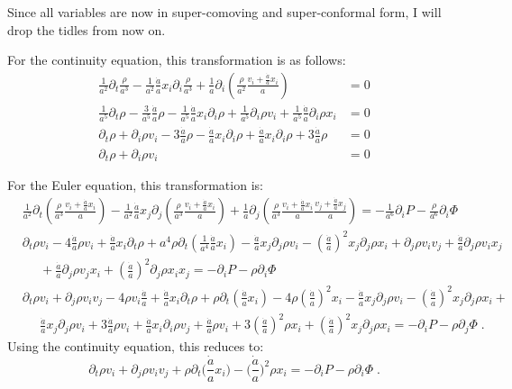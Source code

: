 \documentclass{article}
\begin{document}
Since all variables are now in super-comoving and super-conformal form, I will drop the tidles from now on.

For the continuity equation, this transformation is as follows:
\begin{align*}
\frac{1}{a^2} \partial_t \frac{\rho}{a^3} - \frac{1}{a^2} \frac{\dot{a}}{a} x_i \partial_i \frac{\rho}{a^3} + \frac{1}{a} \partial_i ( \frac{\rho}{a^2} \frac{ v_i + \frac{\dot{a}}{a} x_i}{a} ) &= 0 \\
\frac{1}{a^5} \partial_t \rho - \frac{3}{a^5} \frac{\dot{a}}{a} \rho - \frac{1}{a^5}\frac{\dot{a}}{a} x_i \partial_i \rho + \frac{1}{a^5} \partial_i \rho v_i + \frac{1}{a^5} \frac{\dot{a}}{a} \partial_i \rho x_i &=0 \\
\partial_t \rho + \partial_i \rho v_i - 3 \frac{\dot{a}}{a} \rho - \frac{\dot{a}}{a} x_i \partial_i \rho + \frac{\dot{a}}{a} x_i \partial_i \rho + 3 \frac{\dot{a}}{a} \rho &= 0 \\
\partial_t \rho + \partial_i \rho v_i &= 0
\end{align*}

For the Euler equation, this transformation is:
\begin{align*}
  &\frac{1}{a^2} \partial_t ( \frac{\rho}{a^3} \frac{v_i +\frac{\dot{a}}{a} x_i}{a} ) 
- \frac{1}{a^2} \frac{\dot{a}}{a} x_j \partial_j ( \frac{\rho}{a^3} \frac{ v_i + \frac{\dot{a}}{a} x_i }{a} ) 
+ \frac{1}{a} \partial_j ( \frac{\rho}{a^3} \frac{v_i + \frac{\dot{a}}{a} x_i}{a} \frac{v_j + \frac{\dot{a}}{a} x_j }{a} ) 
= - \frac{1}{a^6} \partial_i P - \frac{\rho}{a^6} \partial_i \Phi \\
&\partial_t \rho v_i 
-4 \frac{\dot{a}}{a} \rho v_i 
+ \frac{\dot{a}}{a} x_i \partial_t \rho 
+ a^4 \rho \partial_t ( \frac{1}{a^4} \frac{\dot{a}}{a} x_i  ) 
- \frac{\dot{a}}{a} x_j  \partial_j \rho v_i 
- (\frac{\dot{a}}{a})^2 x_j \partial_j \rho x_i 
+ \partial_j \rho v_i v_j 
+ \frac{\dot{a}}{a} \partial_j \rho v_i x_j \\
&\;\;\;\;\;+ \frac{\dot{a}}{a} \partial_j \rho v_j x_i 
+ (\frac{\dot{a}}{a} )^2 \partial_j \rho x_i x_j 
= - \partial_i P - \rho \partial_i \Phi\\
&\partial_t \rho v_i + \partial_j \rho v_i v_j - 4 \rho v_i \frac{\dot{a}}{a} + \frac{\dot{a}}{a} x_i \partial_t \rho + \rho \partial_t ( \frac{\dot{a}}{a} x_i ) - 4 \rho (\frac{\dot{a}}{a})^2 x_i - \frac{\dot{a}}{a} x_j \partial_j \rho v_i - ( \frac{\dot{a}}{a} )^2 x_j \partial_j \rho x_i +\\ &\;\;\;\;\;\frac{\dot{a}}{a} x_j \partial_j \rho v_i + 3 \frac{\dot{a}}{a} \rho v_i + \frac{\dot{a}}{a} x_i \partial_i \rho v_j + \frac{\dot{a}}{a} \rho v_i + 3 ( \frac{\dot{a}}{a} )^2 \rho x_i + (\frac{\dot{a}}{a})^2 x_j \partial_j \rho x_i = - \partial_i P -\rho \partial_j \Phi \;.
\end{align*}
Using the continuity equation, this reduces to:
\begin{equation}
\partial_t \rho v_i + \partial_j \rho v_i v_j + \rho \partial_t \bigg(\frac{\dot{a}}{a} x_i \bigg) - \bigg( \frac{\dot{a}}{a} \bigg)^2 \rho x_i = - \partial_i P - \rho \partial_i \Phi \;.
\end{equation}
\end{document}
